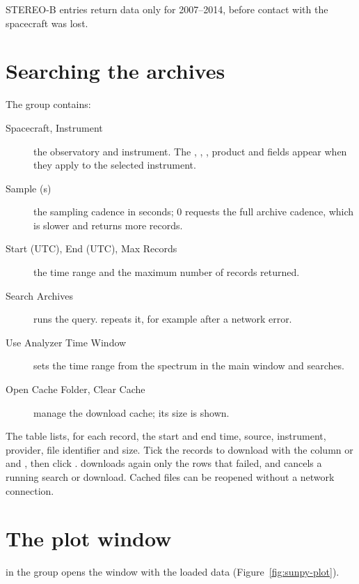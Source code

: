 STEREO-B entries return data only for 2007--2014, before contact with the spacecraft was
lost.

\section{Searching the archives}

The  group contains:
\begin{description}
  \item[Spacecraft, Instrument] the observatory and instrument. The ,
    , , product and  fields appear when
    they apply to the selected instrument.
  \item[Sample (s)] the sampling cadence in seconds; 0 requests the full archive cadence,
    which is slower and returns more records.
  \item[Start (UTC), End (UTC), Max Records] the time range and the maximum number of
    records returned.
  \item[Search Archives] runs the query.  repeats it, for example after
    a network error.
  \item[Use Analyzer Time Window] sets the time range from the spectrum in the main window and
    searches.
  \item[Open Cache Folder, Clear Cache] manage the download cache; its size is shown.
\end{description}

The  table lists, for each record, the start and end time, source,
instrument, provider, file identifier and size. Tick the records to download with the
 column or  and , then click
.  downloads again only the rows that
failed, and  cancels a running search or download. Cached files can be reopened
without a network connection.

\section{The plot window}

 in the  group opens the
 window with the loaded data (Figure~\ref{fig:sunpy-plot}).


